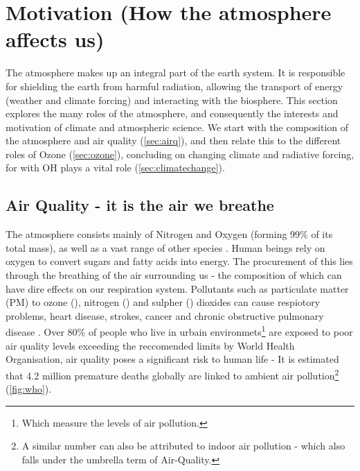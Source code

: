 

\section{Motivation (How the atmosphere affects us)}
The atmosphere makes up an integral part of the earth system. It is responsible for shielding the earth from harmful radiation, allowing the transport of energy (weather and climate forcing) and interacting with the biosphere. This section explores the many roles of the atmosphere, and consequently the interests and motivation of climate and atmospheric science. We start with the composition of the atmosphere and air quality (\autoref{sec:airq}), and then relate this to the different roles of Ozone (\autoref{sec:ozone}), concluding on changing climate and radiative forcing, for with OH plays a vital role (\autoref{sec:climatechange}).



\subsection{Air Quality - it is the air we breathe}\label{sec:airq}
The atmosphere consists mainly of Nitrogen and Oxygen (forming 99\% of its total mass), as well as a vast range of other species \citep{ac}. Human beings rely on oxygen to convert sugars and fatty acids into energy. The procurement of this lies through the breathing of the air surrounding us - the composition of which can have dire effects on our respiration system. Pollutants such as particulate matter (PM) to ozone (), nitrogen () and sulpher () dioxides can cause respiotory problems, heart disease, strokes, cancer and chronic obstructive pulmonary disease \cite{who}. Over 80\% of people who live in urbain environmets\footnote{Which measure the levels of air pollution.} are exposed to poor air quality levels exceeding the reccomended limits by World Health Organisation, air quality poses a significant risk to human life - It is estimated that 4.2 million premature deaths globally are linked to ambient air pollution\footnote{A similar number can also be attributed to indoor air pollution - which also falls under the umbrella term of Air-Quality.} (\autoref{fig:who}).


